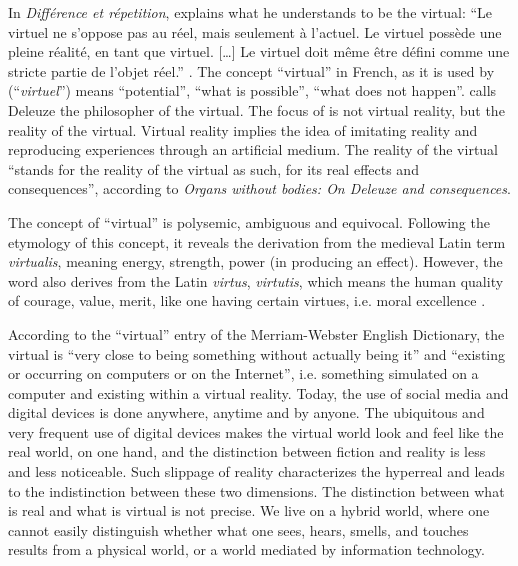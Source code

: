 \documentclass[english]{textolivre}
\begin{document}
In \textit{Différence et répetition}, \textcite{deleuze_difference_1968} explains what he understands to be the virtual: “Le virtuel ne s’oppose pas au réel, mais seulement à l’actuel. Le virtuel possède une pleine réalité, en tant que virtuel. […] Le virtuel doit même être défini comme une stricte partie de l’objet réel.” \cite[p.~269]{deleuze_difference_1968}. The concept “virtual” in French, as it is used by \textcite{deleuze_difference_1968} (“\textit{virtuel}”) means “potential”, “what is possible”, “what does not happen”. \textcite[p.~3]{zizek_organs_2004} calls Deleuze the philosopher of the virtual. The focus of \textcite{deleuze_difference_1968} is not virtual reality, but the reality of the virtual. Virtual reality implies the idea of imitating reality and reproducing experiences through an artificial medium. The reality of the virtual “stands for the reality of the virtual as such, for its real effects and consequences”, according to \textcite{zizek_organs_2004} \textit{Organs without bodies: On Deleuze and consequences}.

The concept of “virtual” is polysemic, ambiguous and equivocal. Following the etymology of this concept, it reveals the derivation from the medieval Latin term \textit{virtualis}, meaning energy, strength, power (in producing an effect). However, the word also derives from the Latin \textit{virtus}, \textit{virtutis}, which means the human quality of courage, value, merit, like one having certain virtues, i.e. moral excellence \cite[p.~135]{barroso_reality_2019}.

According to the “virtual” entry of the Merriam-Webster English Dictionary, the virtual is “very close to being something without actually being it” and “existing or occurring on computers or on the Internet”, i.e. something simulated on a computer and existing within a virtual reality. Today, the use of social media and digital devices is done anywhere, anytime and by anyone. The ubiquitous and very frequent use of digital devices makes the virtual world look and feel like the real world, on one hand, and the distinction between fiction and reality is less and less noticeable. Such slippage of reality characterizes the hyperreal and leads to the indistinction between these two dimensions. The distinction between what is real and what is virtual is not precise. We live on a hybrid world, where one cannot easily distinguish whether what one sees, hears, smells, and touches results from a physical world, or a world mediated by information technology.
\end{document}
